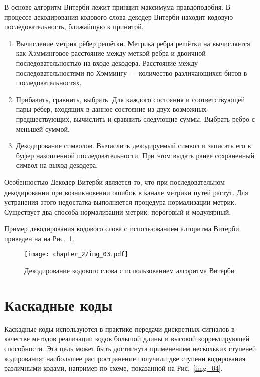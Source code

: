 В основе алгоритм Витерби лежит принцип максимума правдоподобия. В процессе декодирования кодового слова
декодер Витерби находит кодовую последовательность, ближайшую к принятой. 

\begin{enumerate}
\item Вычисление метрик рёбер решётки. Метрика ребра решётки на вычисляется как Хэмминговое расстояние
между меткой ребра и двоичной последовательностью на входе декодера. Расстояние между последовательностями
по Хэммингу --- количество различающихся битов в последовательностях.
\item Прибавить, сравнить, выбрать.
Для каждого состояния и соответствующей пары рёбер, входящих в данное состояние из двух возможных
предшествующих, вычислить и сравнить следующие суммы. Выбрать ребро с меньшей суммой.
\item Декодирование символов.
Вычислить декодируемый символ и записать его в буфер накопленной последовательности. При этом выдать
ранее сохраненный символ на выход декодера.
\end{enumerate}

Особенностью Декодер Витерби является то, что при последовательном декодировании при возникновении
ошибок в канале метрики путей растут. Для устранения этого недостатка выполняется процедура
нормализации метрик. Существует два способа нормализации метрик: пороговый и модулярный.

Пример декодирования кодового слова с использованием алгоритма Витерби приведен на на Рис.~\ref{img_03}.

\begin{figure}[htbp]
\begin{center}
\texttt{[image: chapter\_2/img\_03.pdf]}
\end{center}
\caption{Декодирование кодового слова с использованием алгоритма Витерби}
\label{img_03}
\end{figure}

\section{Каскадные коды}
Каскадные коды используются в практике передачи дискретных сигналов в качестве методов реализации кодов 
большой длины и высокой корректирующей способности. Эта цель может быть достигнута применением нескольких 
ступеней кодирования; наибольшее распространение получили две ступени кодирования различными кодами, например 
по схеме, показанной на Рис.~\ref{img_04}.

